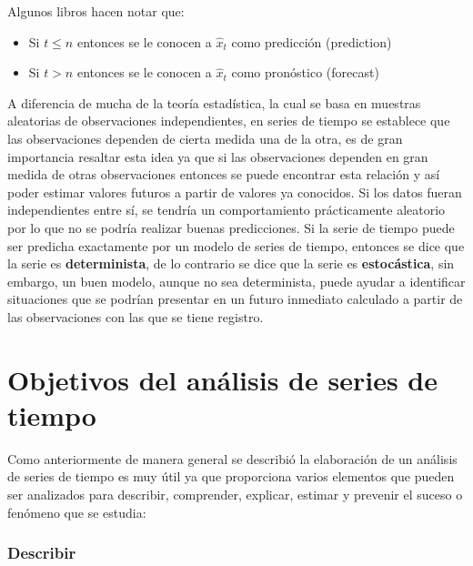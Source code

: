 \documentclass[
  spanish,
]{book}
\theoremstyle{remark}
\begin{document}
Algunos libros hacen notar que:

\begin{itemize}
\item
  Si \(t\le n\) entonces se le conocen a \(\hat{x}_t\) como predicción (prediction)
\item
  Si \(t > n\) entonces se le conocen a \(\hat{x}_t\) como pronóstico (forecast)
\end{itemize}

A diferencia de mucha de la teoría estadística, la cual se basa en muestras aleatorias de observaciones independientes, en series de tiempo se establece que las observaciones dependen de cierta medida una de la otra, es de gran importancia resaltar esta idea ya que si las observaciones dependen en gran medida de otras observaciones entonces se puede encontrar esta relación y así poder estimar valores futuros a partir de valores ya conocidos. Si los datos fueran independientes entre sí, se tendría un comportamiento prácticamente aleatorio por lo que no se podría realizar buenas predicciones. Si la serie de tiempo puede ser predicha exactamente por un modelo de series de tiempo, entonces se dice que la serie es \textbf{determinista}, de lo contrario se dice que la serie es \textbf{estocástica}, sin embargo, un buen modelo, aunque no sea determinista, puede ayudar a identificar situaciones que se podrían presentar en un futuro inmediato calculado a partir de las observaciones con las que se tiene registro.

\hypertarget{objetivos-del-anuxe1lisis-de-series-de-tiempo}{%
\section{Objetivos del análisis de series de tiempo}\label{objetivos-del-anuxe1lisis-de-series-de-tiempo}}

Como anteriormente de manera general se describió la elaboración de un análisis de series de tiempo es muy útil ya que proporciona varios elementos que pueden ser analizados para describir, comprender, explicar, estimar y prevenir el suceso o fenómeno que se estudia:

\hypertarget{describir}{%
\subsubsection*{Describir}\label{describir}}
\end{document}
